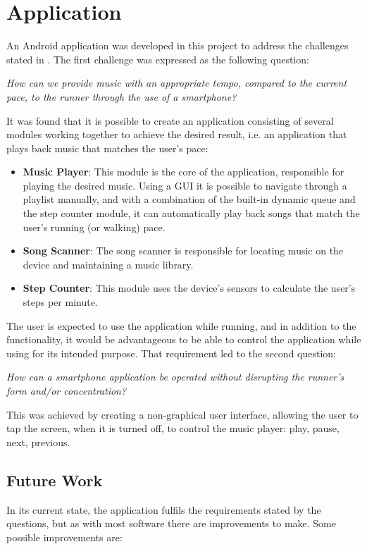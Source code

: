 \section{Application}
An Android application was developed in this project to address the challenges stated in . The first challenge was expressed as the following question:

\begin{center}
\textit{How can we provide music with an appropriate tempo, compared to the current pace, to the runner through the use of a smartphone?}
\end{center}

It was found that it is possible to create an application consisting of several modules working together to achieve the desired result, i.e. an application that plays back music that matches the user's pace:

\begin{itemize}
\item \textbf{Music Player}: This module is the core of the application, responsible for playing the desired music. Using a GUI it is possible to navigate through a playlist manually, and with a combination of the built-in dynamic queue and the step counter module, it can automatically play back songs that match the user's running (or walking) pace.
\item \textbf{Song Scanner}: The song scanner is responsible for locating music on the device and maintaining a music library.
\item \textbf{Step Counter}: This module uses the device's sensors to calculate the user's steps per minute.
\end{itemize}

The user is expected to use the application while running, and in addition to the functionality, it would be advantageous to be able to control the application while using for its intended purpose. That requirement led to the second question:

\begin{center}
\textit{How can a smartphone application be operated without disrupting the runner's form and/or concentration?}
\end{center}

This was achieved by creating a non-graphical user interface, allowing the user to tap the screen, when it is turned off, to control the music player: play, pause, next, previous.


\subsection{Future Work}
In its current state, the application fulfils the requirements stated by the questions, but as with most software there are improvements to make. Some possible improvements are:

